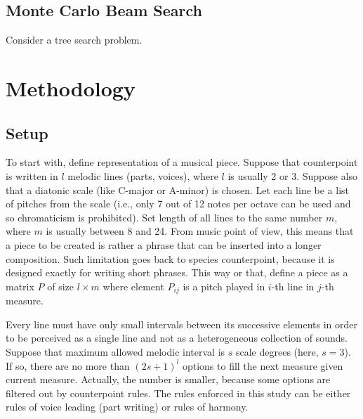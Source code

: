 \documentclass{article}
\begin{document}
\subsection{Monte Carlo Beam Search}
\label{subsec:montecarlo}

Consider a tree search problem.

\section{Methodology}
\label{sec:methodology}

\subsection{Setup}
\label{subsec:setup}

To start with, define representation of a musical piece. Suppose that counterpoint is written in $l$ melodic lines (parts, voices), where $l$ is usually 2 or 3. Suppose also that a diatonic scale (like C-major or A-minor) is chosen. Let each line be a list of pitches from the scale (i.e., only 7 out of 12 notes per octave can be used and so chromaticism is prohibited). Set length of all lines to the same number $m$, where $m$ is usually between 8 and 24. From music point of view, this means that a piece to be created is rather a phrase that can be inserted into a longer composition. Such limitation goes back to species counterpoint, because it is designed exactly for writing short phrases. This way or that, define a piece as a matrix $P$ of size $l \times m$ where element $P_{ij}$ is a pitch played in $i$-th line in $j$-th measure.

Every line must have only small intervals between its successive elements in order to be perceived as a single line and not as a heterogeneous collection of sounds. Suppose that maximum allowed melodic interval is $s$ scale degrees (here, $s = 3$). If so, there are no more than $(2s + 1)^l$ options to fill the next measure given current measure. Actually, the number is smaller, because some options are filtered out by counterpoint rules. The rules enforced in this study can be either rules of voice leading (part writing) or rules of harmony.
\end{document}

